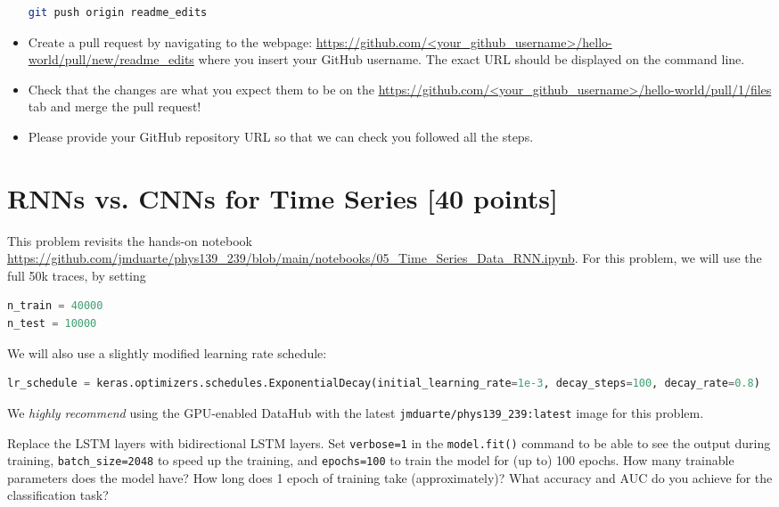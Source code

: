 \begin{problem}[20]
\begin{itemize}
	      \begin{lstlisting}[language=bash]
git push origin readme_edits
\end{lstlisting}
	\item Create a pull request by navigating to the webpage: \url{https://github.com/<your_github_username>/hello-world/pull/new/readme_edits} where you insert your GitHub username.
	      The exact URL should be displayed on the command line.
	\item Check that the changes are what you expect them to be on the \url{https://github.com/<your_github_username>/hello-world/pull/1/files} tab and merge the pull request!
	\item Please provide your GitHub repository URL so that we can check you followed all the steps.
\end{itemize}
\end{problem}

\section{RNNs vs. CNNs for Time Series [40 points]}

This problem revisits the hands-on notebook \url{https://github.com/jmduarte/phys139_239/blob/main/notebooks/05_Time_Series_Data_RNN.ipynb}.
For this problem, we will use the full 50k traces, by setting
\begin{lstlisting}[language=python]
n_train = 40000
n_test = 10000
\end{lstlisting}
We will also use a slightly modified learning rate schedule:
\begin{lstlisting}[language=python]
lr_schedule = keras.optimizers.schedules.ExponentialDecay(initial_learning_rate=1e-3, decay_steps=100, decay_rate=0.8)
\end{lstlisting}
We \emph{highly recommend} using the GPU-enabled DataHub with the latest \texttt{jmduarte/phys139_239:latest} image for this problem.

\begin{problem}[15]
Replace the LSTM layers with bidirectional LSTM layers.
Set \texttt{verbose=1} in the \texttt{model.fit()} command to be able to see the output during training, \texttt{batch\_size=2048} to speed up the training, and \texttt{epochs=100} to train the model for (up to) 100 epochs.
How many trainable parameters does the model have?
How long does 1 epoch of training take (approximately)?
What accuracy and AUC do you achieve for the classification task?
\end{problem}


